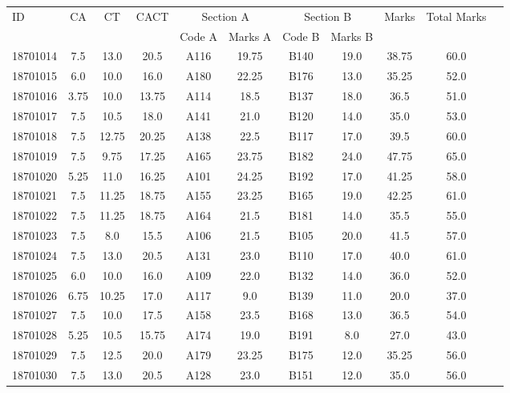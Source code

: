 \documentclass[12pt]{article}
\begin{document}
    \begin{center} 
	\renewcommand{\arraystretch}{1.08}
	\begin{small}
    \begin{tabular}{|l|c|c|c|c|c|c|c|c|c|c|} \hline
	\multirow{2}{*}{ID} & 	\multirow{2}{*}{CA}  & 	\multirow{2}{*}{CT}  & 	\multirow{2}{*}{CACT}  & \multicolumn{2 }{|c|}{Section A}& \multicolumn{2 }{c|}{Section B} & 	\multirow{2}{*}{Marks}  & 	\multirow{2}{*}{Total Marks}  \\ 
	&  &  &  & Code A & Marks A & Code B & Marks B&  &  \\ \hline
18701014 & 7.5 & 13.0 & 20.5 & A116 & 19.75 & B140 & 19.0 & 38.75 & 60.0\\ \hline 
18701015 & 6.0 & 10.0 & 16.0 & A180 & 22.25 & B176 & 13.0 & 35.25 & 52.0\\ \hline 
18701016 & 3.75 & 10.0 & 13.75 & A114 & 18.5 & B137 & 18.0 & 36.5 & 51.0\\ \hline 
18701017 & 7.5 & 10.5 & 18.0 & A141 & 21.0 & B120 & 14.0 & 35.0 & 53.0\\ \hline 
18701018 & 7.5 & 12.75 & 20.25 & A138 & 22.5 & B117 & 17.0 & 39.5 & 60.0\\ \hline 
18701019 & 7.5 & 9.75 & 17.25 & A165 & 23.75 & B182 & 24.0 & 47.75 & 65.0\\ \hline 
18701020 & 5.25 & 11.0 & 16.25 & A101 & 24.25 & B192 & 17.0 & 41.25 & 58.0\\ \hline 
18701021 & 7.5 & 11.25 & 18.75 & A155 & 23.25 & B165 & 19.0 & 42.25 & 61.0\\ \hline 
18701022 & 7.5 & 11.25 & 18.75 & A164 & 21.5 & B181 & 14.0 & 35.5 & 55.0\\ \hline 
18701023 & 7.5 & 8.0 & 15.5 & A106 & 21.5 & B105 & 20.0 & 41.5 & 57.0\\ \hline 
18701024 & 7.5 & 13.0 & 20.5 & A131 & 23.0 & B110 & 17.0 & 40.0 & 61.0\\ \hline 
18701025 & 6.0 & 10.0 & 16.0 & A109 & 22.0 & B132 & 14.0 & 36.0 & 52.0\\ \hline 
18701026 & 6.75 & 10.25 & 17.0 & A117 & 9.0 & B139 & 11.0 & 20.0 & 37.0\\ \hline 
18701027 & 7.5 & 10.0 & 17.5 & A158 & 23.5 & B168 & 13.0 & 36.5 & 54.0\\ \hline 
18701028 & 5.25 & 10.5 & 15.75 & A174 & 19.0 & B191 & 8.0 & 27.0 & 43.0\\ \hline 
18701029 & 7.5 & 12.5 & 20.0 & A179 & 23.25 & B175 & 12.0 & 35.25 & 56.0\\ \hline 
18701030 & 7.5 & 13.0 & 20.5 & A128 & 23.0 & B151 & 12.0 & 35.0 & 56.0\\ \hline 

\end{tabular}
\end{small}
\end{center}
\end{document}
